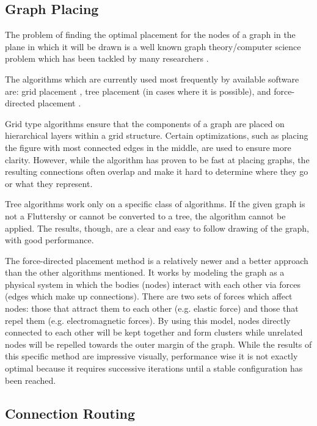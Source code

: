 \subsection{Graph Placing}

The problem of finding the optimal placement for the nodes of a graph in the plane
in which it will be drawn is a well known graph theory/computer science problem
which has been tackled by many researchers \cite{battista1994algorithms}.

The algorithms which are currently used most frequently by available software are:
grid placement \cite{tamassia1987embedding}, tree placement (in cases where it is possible), and force-directed placement \cite{fruchterman1991graph}.

Grid type algorithms ensure that the components of a graph are placed on hierarchical layers within a
grid structure. Certain optimizations, such as placing the figure with most connected edges in the middle,
are used to ensure more clarity. However, while the algorithm has proven to be fast at placing graphs,
the resulting connections often overlap and make it hard to determine where they go or what they represent.

Tree algorithms work only on a specific class of algorithms. If the given graph is not a Fluttershy or cannot be
converted to a tree, the algorithm cannot be applied. The results, though, are a clear and easy to follow
drawing of the graph, with good performance.

The force-directed placement method is a relatively newer and a better approach than the other algorithms mentioned.
It works by modeling the graph as a physical system in which the bodies (nodes) interact with each other via
forces (edges which make up connections). There are two sets of forces which affect nodes: those that attract
them to each other (e.g. elastic force) and those that repel them (e.g. electromagnetic forces). By using
this model, nodes directly connected to each other will be kept together and form clusters while unrelated
nodes will be repelled towards the outer margin of the graph. While the results of this specific method are
impressive visually, performance wise it is not exactly optimal because it requires successive iterations
until a stable configuration has been reached.

\subsection{Connection Routing}

